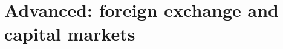 \documentclass[12pt,oneside,openany]{book}
\begin{document}
\part{Advanced: foreign exchange and capital markets}\label{part:advanced}










\end{document}
